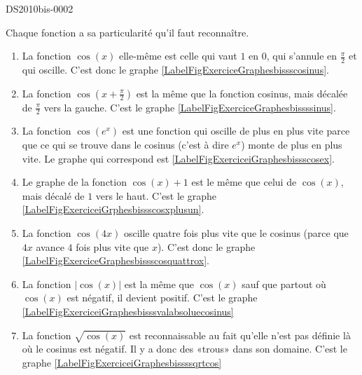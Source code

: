 
\begin{corrige}{DS2010bis-0002}

	Chaque fonction a sa particularité qu'il faut reconnaître.
	\begin{enumerate}
		\item
			La fonction $\cos(x)$ elle-même est celle qui vaut $1$ en $0$, qui s'annule en $\frac{ \pi }{2}$ et qui oscille. C'est donc le graphe \ref{LabelFigExerciceGraphesbissscosinus}.
		\item
			La fonction $\cos(x+\frac{ \pi }{2})$ est la même que la fonction cosinus, mais décalée de $\frac{ \pi }{2}$ vers la gauche. C'est le graphe  \ref{LabelFigExerciceGraphesbissssinus}.
		\item
			La fonction $\cos( e^{x})$ est une fonction qui oscille de plus en plus vite parce que ce qui se trouve dans le cosinus (c'est à dire  $ e^{x}$) monte de plus en plus vite. Le graphe qui correspond est \ref{LabelFigExerciceiGraphesbissscosex}.
		\item
			Le graphe de la fonction $\cos(x)+1$ est le même que celui de $\cos(x)$, mais décalé de $1$ vers le haut. C'est le graphe \ref{LabelFigExerciceiGrphesbissscosxplusun}.
		\item
			La fonction $\cos(4x)$ oscille quatre fois plus vite que le cosinus (parce que $4x$ avance $4$ fois plus vite que $x$). C'est donc le graphe \ref{LabelFigExerciceGraphesbissscosquattrox}.
		\item
			La fonction $| \cos(x) |$ est la même que $\cos(x)$ sauf que partout où $\cos(x)$ est négatif, il devient positif. C'est le graphe \ref{LabelFigExerciceiGraphesbisssvalabsoluecosinus}
		\item
			La fonction $\sqrt{\cos(x)}$ est reconnaissable au fait qu'elle n'est pas définie là où le cosinus est négatif. Il y a donc des «trous» dans son domaine. C'est le graphe \ref{LabelFigExerciceiGraphesbissssqrtcos}
	\end{enumerate}
	

\end{corrige}
